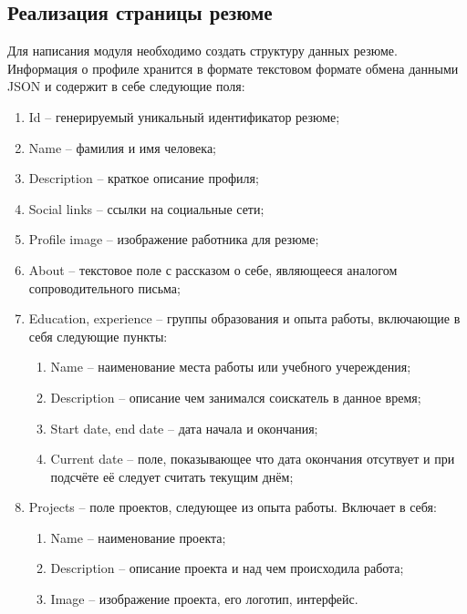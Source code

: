 \documentclass[master, och, pract]{SCWorks}
\begin{document}
\subsection{Реализация страницы резюме}
Для написания модуля необходимо создать структуру данных резюме. Информация о профиле хранится в формате текстовом формате обмена данными JSON и содержит в себе следующие поля:
\begin{enumerate}
    \item Id -- генерируемый уникальный идентификатор резюме;
    \item Name -- фамилия и имя человека;
    \item Description -- краткое описание профиля;
    \item Social links -- ссылки на социальные сети;
    \item Profile image -- изображение работника для резюме;
    \item About -- текстовое поле с рассказом о себе, являющееся аналогом сопроводительного письма;
    \item Education, experience -- группы образования и опыта работы, включающие в себя следующие пункты:
    \begin{enumerate}
        \item Name -- наименование места работы или учебного учереждения;
        \item Description -- описание чем занимался соискатель в данное время;
        \item Start date, end date -- дата начала и окончания; 
        \item Current date -- поле, показывающее что дата окончания отсутвует и при подсчёте её следует считать текущим днём;
    \end{enumerate}
    \item Projects -- поле проектов, следующее из опыта работы. Включает в себя:
    \begin{enumerate}
        \item Name -- наименование проекта;
        \item Description -- описание проекта и над чем происходила работа;
        \item Image -- изображение проекта, его логотип, интерфейс.
    \end{enumerate}
\end{enumerate}
\end{document}
